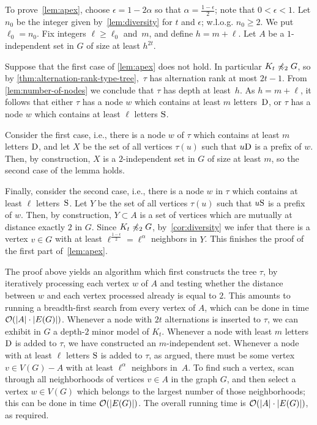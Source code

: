 To prove~\cref{lem:apex}, 
choose $\epsilon=1-2\alpha$ so that $\alpha=\frac{1-\epsilon}{2}$; note that $0<\epsilon<1$.
Let $n_0$ be the integer given by~\cref{lem:diversity} for $t$ and $\epsilon$; w.l.o.g. $n_0\geq 2$.
We put $\ell_0=n_0$.
Fix integers $\ell\ge \ell_0$ and~$m$, and define $h=m+\ell$.
Let $A$ be a $1$-independent set in $G$
of size at least $h^{2t}$.

Suppose that the first case of \cref{lem:apex} does not hold. In particular $K_t\not\preccurlyeq_2 G$, so by \cref{thm:alternation-rank-type-tree},~$\tau$ has alternation rank at most $2t-1$. From \cref{lem:number-of-nodes} 
we conclude that $\tau$  has depth at least~$h$.
As $h=m+\ell$, it follows that either $\tau$  has a node $w$ which contains at least $m$ letters~$\mathrm{D}$, or $\tau$ has a node $w$ which contains  at least $\ell$ letters $\mathrm{S}$.

Consider the first case, i.e., there is a node $w$ of $\tau$
which contains at least $m$ letters $\mathrm{D}$, and let $X$
be the set of all vertices $\tau(u)$ such that $u\mathrm{D}$ is a prefix of $w$. Then, by construction, $X$ is a $2$-independent set in $G$ of size at least $m$, so the second case of the lemma holds.

Finally, consider the second case, i.e., there is a node $w$ in $\tau$ which contains at least $\ell$ letters~$\mathrm{S}$. Let 
$Y$ be the set of all vertices $\tau(u)$ such that $u\mathrm{S}$ is a prefix of $w$. Then, by construction, $Y\subset A$ is a set of vertices which are mutually at distance exactly $2$ in $G$. 
Since $K_t\not\preccurlyeq_2 G$, by~\cref{cor:diversity} we infer that there is a vertex $v\in G$
with at least $\ell^{\frac{1-\epsilon}{2}}=\ell^{\alpha}$ neighbors in $Y$.
This finishes the proof of the first part of~\cref{lem:apex}.

The proof above yields an algorithm which first constructs the tree $\tau$, by 
iteratively processing each vertex $w$ of $A$ and testing whether the distance between $w$ and each vertex processed already is equal to $2$.
This amounts to running a breadth-first search from every vertex of $A$, which can be done in time $\mathcal{O}(|A|\cdot |E(G)|)$.
Whenever a node with $2t$ alternations 
is inserted to $\tau$, we can exhibit in $G$ a depth-$2$ minor model of $K_t$.
Whenever a node with least $m$ letters $\mathrm{D}$ is added to $\tau$,
we have constructed an $m$-independent set. Whenever a node with at least $\ell$ letters $\mathrm{S}$ is added to $\tau$, as argued, there must be some vertex $v\in V(G)-A$ with at least $\ell^\alpha$ neighbors in~$A$. 
To find such a vertex, scan through all neighborhoods of vertices $v\in A$ in the graph $G$, and then select a vertex $w\in V(G)$
which belongs to the largest number of those neighborhoods; this can be done in time $\mathcal{O}(|E(G)|)$.
The overall running time is $\mathcal{O}(|A|\cdot |E(G)|)$, as required.

